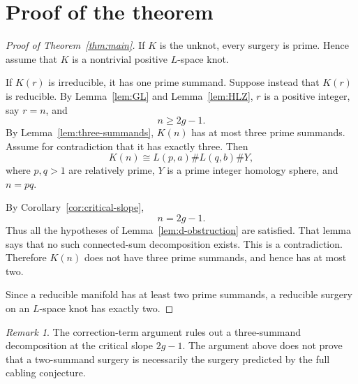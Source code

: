 \documentclass[11pt]{article}
\theoremstyle{definition}
\theoremstyle{remark}
\newtheorem{remark}[theorem]{Remark}
\begin{document}
\section{Proof of the theorem}

\begin{proof}[Proof of Theorem~\ref{thm:main}]
If $K$ is the unknot, every surgery is prime.  Hence assume that $K$ is a
nontrivial positive $L$-space knot.

If $K(r)$ is irreducible, it has one prime summand.  Suppose instead that
$K(r)$ is reducible.  By Lemma~\ref{lem:GL} and Lemma~\ref{lem:HLZ}, $r$
is a positive integer, say $r=n$, and
\[
n\ge 2g-1.
\]
By Lemma~\ref{lem:three-summands}, $K(n)$ has at most three prime summands.
Assume for contradiction that it has exactly three.  Then
\[
K(n)\cong L(p,a)\#L(q,b)\#Y,
\]
where $p,q>1$ are relatively prime, $Y$ is a prime integer homology sphere,
and $n=pq$.

By Corollary~\ref{cor:critical-slope},
\[
n=2g-1.
\]
Thus all the hypotheses of Lemma~\ref{lem:d-obstruction} are satisfied.
That lemma says that no such connected-sum decomposition exists.  This is a
contradiction.  Therefore $K(n)$ does not have three prime summands, and
hence has at most two.

Since a reducible manifold has at least two prime summands, a reducible
surgery on an $L$-space knot has exactly two.
\end{proof}

\begin{remark}
The correction-term argument rules out a three-summand decomposition at the
critical slope $2g-1$.  The argument above does not prove that a
two-summand surgery is necessarily the surgery predicted by the full
cabling conjecture.
\end{remark}
\end{document}
